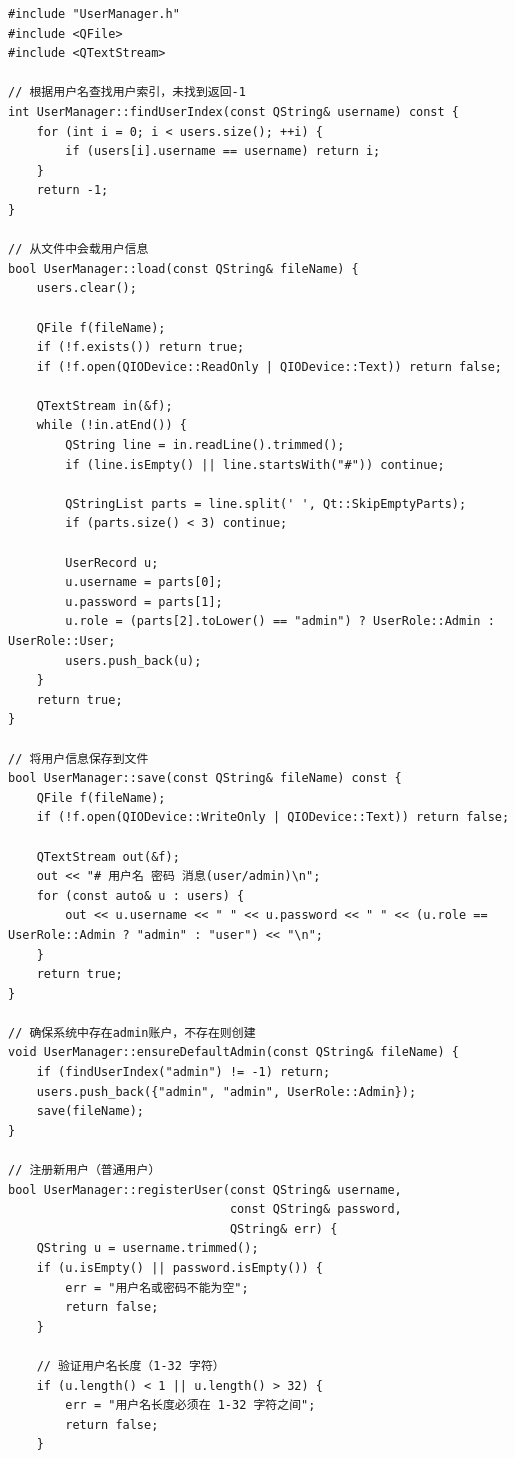\documentclass[UTF8,12pt,a4paper]{ctexart}
\begin{document}
\begin{lstlisting}[caption={UserManager.cpp 源码}]
#include "UserManager.h"
#include <QFile>
#include <QTextStream>

// 根据用户名查找用户索引，未找到返回-1
int UserManager::findUserIndex(const QString& username) const {
    for (int i = 0; i < users.size(); ++i) {
        if (users[i].username == username) return i;
    }
    return -1;
}

// 从文件中会载用户信息
bool UserManager::load(const QString& fileName) {
    users.clear();

    QFile f(fileName);
    if (!f.exists()) return true;
    if (!f.open(QIODevice::ReadOnly | QIODevice::Text)) return false;

    QTextStream in(&f);
    while (!in.atEnd()) {
        QString line = in.readLine().trimmed();
        if (line.isEmpty() || line.startsWith("#")) continue;

        QStringList parts = line.split(' ', Qt::SkipEmptyParts);
        if (parts.size() < 3) continue;

        UserRecord u;
        u.username = parts[0];
        u.password = parts[1];
        u.role = (parts[2].toLower() == "admin") ? UserRole::Admin : UserRole::User;
        users.push_back(u);
    }
    return true;
}

// 将用户信息保存到文件
bool UserManager::save(const QString& fileName) const {
    QFile f(fileName);
    if (!f.open(QIODevice::WriteOnly | QIODevice::Text)) return false;

    QTextStream out(&f);
    out << "# 用户名 密码 消息(user/admin)\n";
    for (const auto& u : users) {
        out << u.username << " " << u.password << " " << (u.role == UserRole::Admin ? "admin" : "user") << "\n";
    }
    return true;
}

// 确保系统中存在admin账户，不存在则创建
void UserManager::ensureDefaultAdmin(const QString& fileName) {
    if (findUserIndex("admin") != -1) return;
    users.push_back({"admin", "admin", UserRole::Admin});
    save(fileName);
}

// 注册新用户（普通用户）
bool UserManager::registerUser(const QString& username,
                               const QString& password,
                               QString& err) {
    QString u = username.trimmed();
    if (u.isEmpty() || password.isEmpty()) {
        err = "用户名或密码不能为空";
        return false;
    }

    // 验证用户名长度（1-32 字符）
    if (u.length() < 1 || u.length() > 32) {
        err = "用户名长度必须在 1-32 字符之间";
        return false;
    }


\end{lstlisting}
\end{document}
